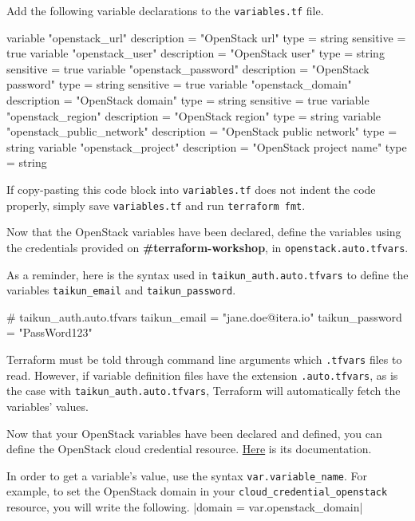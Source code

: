 Add the following variable declarations to the \texttt{variables.tf} file.
\begin{tf}
variable "openstack_url" {
  description = "OpenStack url"
  type        = string
  sensitive   = true
}
variable "openstack_user" {
  description = "OpenStack user"
  type        = string
  sensitive   = true
}
variable "openstack_password" {
  description = "OpenStack password"
  type        = string
  sensitive   = true
}
variable "openstack_domain" {
  description = "OpenStack domain"
  type        = string
  sensitive   = true
}
variable "openstack_region" {
  description = "OpenStack region"
  type        = string
}
variable "openstack_public_network" {
  description = "OpenStack public network"
  type        = string
}
variable "openstack_project" {
  description = "OpenStack project name"
  type        = string
}
\end{tf}
\begin{note}
  If copy-pasting this code block into \texttt{variables.tf} does not indent the code properly,
  simply save \texttt{variables.tf} and run \texttt{terraform fmt}.
\end{note}

Now that the OpenStack variables have been declared,
define the variables using the credentials provided on \textbf{\#terraform-workshop}, in \texttt{openstack.auto.tfvars}.

\begin{tip}
As a reminder, here is the syntax used in \texttt{taikun\_auth.auto.tfvars} to define the variables \texttt{taikun\_email}
and \texttt{taikun\_password}.
\begin{tf}
# taikun_auth.auto.tfvars
taikun_email = "jane.doe@itera.io"
taikun_password = "PassWord123"
\end{tf}
\end{tip}

\begin{tip}
  Terraform must be told through command line arguments which \texttt{.tfvars} files to read.
  However, if variable definition files have the extension \texttt{.auto.tfvars}, as is the case with
  \texttt{taikun\_auth.auto.tfvars}, Terraform will automatically fetch the variables' values.
\end{tip}

Now that your OpenStack variables have been declared and defined, you can define the OpenStack cloud credential resource.
\href{https://intuinewin.github.io/taikun-docs/resources/cloud_credential_openstack.html}{Here} is its documentation.

\begin{tip}
In order to get a variable's value, use the syntax \texttt{var.variable\_name}.
For example, to set the OpenStack domain in your \texttt{cloud\_credential\_openstack} resource,
  you will write the following. |domain = var.openstack_domain|
\end{tip}
